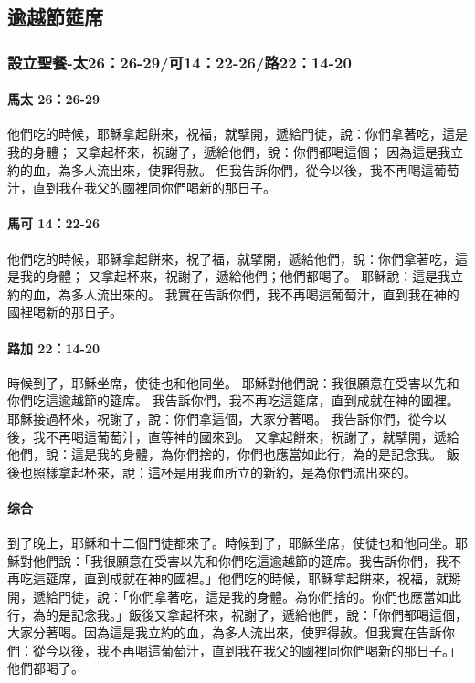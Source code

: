 \subsection{逾越節筵席}


\subsubsection{設立聖餐-太26：26-29/可14：22-26/路22：14-20}
\paragraph{馬太 26：26-29}
他們吃的時候，耶穌拿起餅來，祝福，就擘開，遞給門徒，說：你們拿著吃，這是我的身體；
又拿起杯來，祝謝了，遞給他們，說：你們都喝這個；
因為這是我立約的血，為多人流出來，使罪得赦。
但我告訴你們，從今以後，我不再喝這葡萄汁，直到我在我父的國裡同你們喝新的那日子。
\paragraph{馬可 14：22-26}
他們吃的時候，耶穌拿起餅來，祝了福，就擘開，遞給他們，說：你們拿著吃，這是我的身體；
又拿起杯來，祝謝了，遞給他們；他們都喝了。
耶穌說：這是我立約的血，為多人流出來的。
我實在告訴你們，我不再喝這葡萄汁，直到我在神的國裡喝新的那日子。
\paragraph{路加 22：14-20}
時候到了，耶穌坐席，使徒也和他同坐。
耶穌對他們說：我很願意在受害以先和你們吃這逾越節的筵席。
我告訴你們，我不再吃這筵席，直到成就在神的國裡。
耶穌接過杯來，祝謝了，說：你們拿這個，大家分著喝。
我告訴你們，從今以後，我不再喝這葡萄汁，直等神的國來到。
又拿起餅來，祝謝了，就擘開，遞給他們，說：這是我的身體，為你們捨的，你們也應當如此行，為的是記念我。
飯後也照樣拿起杯來，說：這杯是用我血所立的新約，是為你們流出來的。
\paragraph{综合}
到了晚上，耶穌和十二個門徒都來了。時候到了，耶穌坐席，使徒也和他同坐。耶穌對他們說：「我很願意在受害以先和你們吃這逾越節的筵席。我告訴你們，我不再吃這筵席，直到成就在神的國裡。」他們吃的時候，耶穌拿起餅來，祝福，就掰開，遞給門徒，說：「你們拿著吃，這是我的身體。為你們捨的。你們也應當如此行，為的是記念我。」飯後又拿起杯來，祝謝了，遞給他們，說：「你們都喝這個，大家分著喝。因為這是我立約的血，為多人流出來，使罪得赦。但我實在告訴你們：從今以後，我不再喝這葡萄汁，直到我在我父的國裡同你們喝新的那日子。」他們都喝了。





